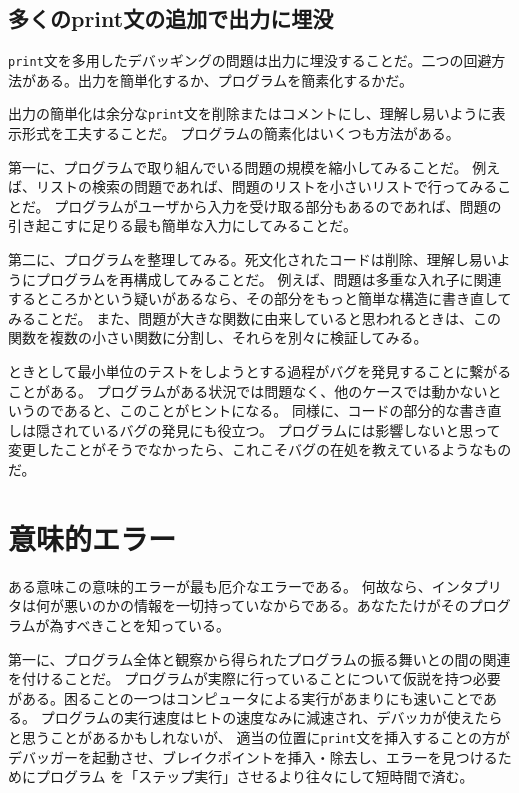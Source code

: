 \documentclass[a4j,12pt,makeidx]{jbook}
\begin{document}
\subsection*{多くのprint文の追加で出力に埋没}
{\tt print}文を多用したデバッギングの問題は出力に埋没することだ。二つの回避方法がある。出力を簡単化するか、プログラムを簡素化するかだ。\par
出力の簡単化は余分な{\tt print}文を削除またはコメントにし、理解し易いように表示形式を工夫することだ。
プログラムの簡素化はいくつも方法がある。\par
第一に、プログラムで取り組んでいる問題の規模を縮小してみることだ。
例えば、リストの検索の問題であれば、問題のリストを小さいリストで行ってみることだ。
プログラムがユーザから入力を受け取る部分もあるのであれば、問題の引き起こすに足りる最も簡単な入力にしてみることだ。\par
第二に、プログラムを整理してみる。死文化されたコードは削除、理解し易いようにプログラムを再構成してみることだ。
例えば、問題は多重な入れ子に関連するところかという疑いがあるなら、その部分をもっと簡単な構造に書き直してみることだ。
また、問題が大きな関数に由来していると思われるときは、この関数を複数の小さい関数に分割し、それらを別々に検証してみる。\par
ときとして最小単位のテストをしようとする過程がバグを発見することに繋がることがある。
プログラムがある状況では問題なく、他のケースでは動かないというのであると、このことがヒントになる。
同様に、コードの部分的な書き直しは隠されているバグの発見にも役立つ。
プログラムには影響しないと思って変更したことがそうでなかったら、これこそバグの在処を教えているようなものだ。
%
\section{意味的エラー}
ある意味この意味的エラーが最も厄介なエラーである。
何故なら、インタプリタは何が悪いのかの情報を一切持っていなからである。あなたたけがそのプログラムが為すべきことを知っている。\par
第一に、プログラム全体と観察から得られたプログラムの振る舞いとの間の関連を付けることだ。
プログラムが実際に行っていることについて仮説を持つ必要がある。困ることの一つはコンピュータによる実行があまりにも速いことである。
プログラムの実行速度はヒトの速度なみに減速され、デバッカが使えたらと思うことがあるかもしれないが、
適当の位置に{\tt print}文を挿入することの方がデバッガーを起動させ、ブレイクポイントを挿入・除去し、エラーを見つけるためにプログラム
を「ステップ実行」させるより往々にして短時間で済む。
\end{document}
